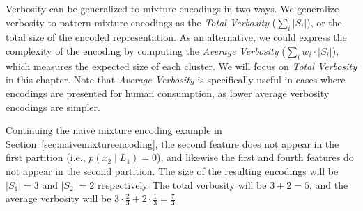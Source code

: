 Verbosity can be generalized to mixture encodings in two ways.
We generalize verbosity to pattern mixture encodings as the \textit{Total Verbosity} ($\sum_{i}|S_i|$), or the total size of the encoded representation.
As an alternative, we could express the complexity of the encoding by computing the \textit{Average Verbosity} ($\sum_{i}w_i \cdot |S_i|$), which measures the expected size of each cluster.
We will focus on \textit{Total Verbosity} in this chapter. 
Note that \textit{Average Verbosity} is specifically useful in cases where \systemnameone encodings are presented for human consumption, as lower average verbosity encodings are simpler.
 \begin{example}
Continuing the naive mixture encoding example in Section~\ref{sec:naivemixtureencoding}, the second feature does not appear in the first partition (i.e., $p(x_2\;|\;L_1) = 0$), and likewise the first and fourth features do not appear in the second partition.
 The size of the resulting encodings will be $|S_1| = 3$ and $|S_2| = 2$ respectively.
 The total verbosity will be $3+2=5$, and the average verbosity will be $3\cdot\frac{2}{3}+2\cdot\frac{1}{3} = \frac{7}{3}$
 \end{example}


